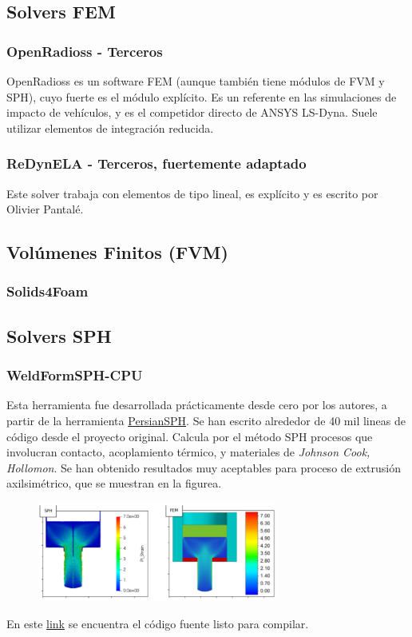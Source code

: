 \documentclass{article}
\begin{document}
\subsection{Solvers FEM}

\subsubsection{OpenRadioss - Terceros}
OpenRadioss es un software FEM (aunque también tiene módulos de FVM y SPH), cuyo fuerte es el módulo explícito. Es un referente en las simulaciones de impacto de vehículos, y es el competidor directo de ANSYS LS-Dyna. Suele utilizar elementos de integración reducida. 

\subsubsection{ReDynELA - Terceros, fuertemente adaptado}
Este solver trabaja con elementos de tipo lineal, es explícito y es escrito por Olivier Pantalé. 

\subsection{Volúmenes Finitos (FVM)}
\subsubsection{Solids4Foam}


\subsection{Solvers SPH}
\subsubsection{WeldFormSPH-CPU}
Esta herramienta fue desarrollada prácticamente desde cero por los autores, a partir de la herramienta \href{https://github.com/mghkorzani/persiansph}{PersianSPH}. Se han escrito alrededor de 40 mil lineas de código desde el proyecto original. Calcula por el método SPH procesos que involucran contacto, acoplamiento térmico, y materiales de \textit{Johnson Cook, Hollomon}. Se han obtenido resultados muy aceptables para proceso de extrusión axilsimétrico, que se muestran en la figurea.
\begin{figure}
\includegraphics[width=0.7\textwidth]{images/20240723_01.png}
\end{figure}
En este \href{https://github.com/luchete80/weldform}{link} se encuentra el código fuente listo para compilar. 
\end{document}
